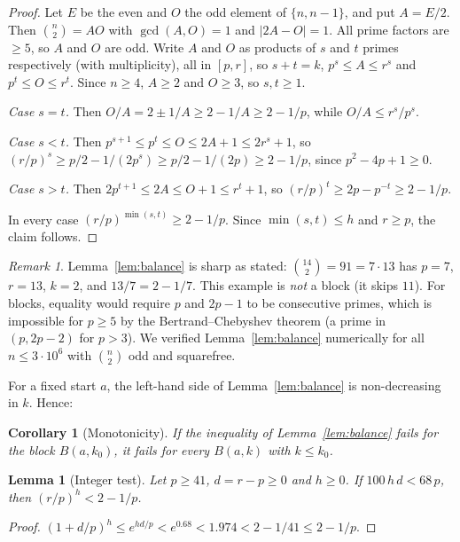 \documentclass[11pt]{article}
\newtheorem{lemma}[theorem]{Lemma}
\newtheorem{corollary}[theorem]{Corollary}
\theoremstyle{remark}
\newtheorem{remark}[theorem]{Remark}
\newcommand{\binomtwo}[1]{\binom{#1}{2}}
\begin{document}
\begin{proof}
Let $E$ be the even and $O$ the odd element of $\{n, n-1\}$, and put $A = E/2$. Then
$\binomtwo{n} = AO$ with $\gcd(A,O) = 1$ and $|2A - O| = 1$. All prime factors are $\ge 5$,
so $A$ and $O$ are odd. Write $A$ and $O$ as products of $s$ and $t$ primes respectively
(with multiplicity), all in $[p,r]$, so $s+t = k$, $p^s \le A \le r^s$ and
$p^t \le O \le r^t$. Since $n \ge 4$, $A \ge 2$ and $O \ge 3$, so $s,t \ge 1$.

\emph{Case $s=t$.} Then $O/A = 2 \pm 1/A \ge 2 - 1/A \ge 2 - 1/p$, while
$O/A \le r^s/p^s$.

\emph{Case $s<t$.} Then $p^{s+1} \le p^t \le O \le 2A+1 \le 2r^s+1$, so
$(r/p)^s \ge p/2 - 1/(2p^s) \ge p/2 - 1/(2p) \ge 2 - 1/p$, since $p^2 - 4p + 1 \ge 0$.

\emph{Case $s>t$.} Then $2p^{t+1} \le 2A \le O+1 \le r^t+1$, so
$(r/p)^t \ge 2p - p^{-t} \ge 2 - 1/p$.

In every case $(r/p)^{\min(s,t)} \ge 2 - 1/p$. Since $\min(s,t) \le h$ and $r \ge p$, the
claim follows.
\end{proof}

\begin{remark}
Lemma~\ref{lem:balance} is sharp as stated: $\binomtwo{14} = 91 = 7\cdot 13$ has $p=7$,
$r=13$, $k=2$, and $13/7 = 2 - 1/7$. This example is \emph{not} a block (it skips $11$).
For blocks, equality would require $p$ and $2p-1$ to be consecutive primes, which is
impossible for $p \ge 5$ by the Bertrand--Chebyshev theorem (a prime in $(p, 2p-2)$ for
$p>3$). We verified Lemma~\ref{lem:balance} numerically for all $n \le 3\cdot 10^6$ with
$\binomtwo{n}$ odd and squarefree.
\end{remark}

For a fixed start $a$, the left-hand side of Lemma~\ref{lem:balance} is non-decreasing in
$k$. Hence:

\begin{corollary}[Monotonicity]\label{cor:mono}
If the inequality of Lemma~\ref{lem:balance} fails for the block $B(a,k_0)$, it fails for
every $B(a,k)$ with $k \le k_0$.
\end{corollary}

\begin{lemma}[Integer test]\label{lem:test}
Let $p \ge 41$, $d = r-p \ge 0$ and $h \ge 0$. If $100\,h\,d < 68\,p$, then
$(r/p)^h < 2 - 1/p$.
\end{lemma}
\begin{proof}
$(1+d/p)^h \le e^{hd/p} < e^{0.68} < 1.974 < 2 - 1/41 \le 2 - 1/p$.
\end{proof}
\end{document}
